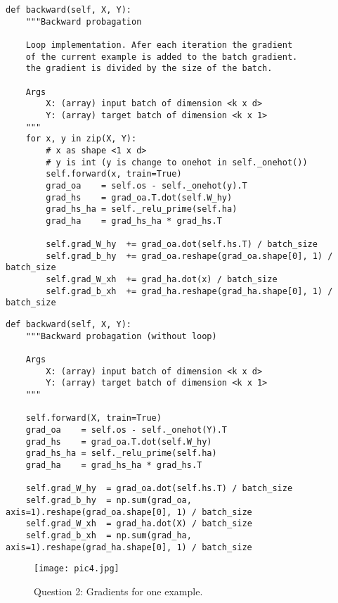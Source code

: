 \documentclass[11pt,english]{article}
\begin{document}
\begin{verbatim}
def backward(self, X, Y):
    """Backward probagation
    
    Loop implementation. Afer each iteration the gradient 
    of the current example is added to the batch gradient.
    the gradient is divided by the size of the batch.
    
    Args
        X: (array) input batch of dimension <k x d>
        Y: (array) target batch of dimension <k x 1>
    """
    for x, y in zip(X, Y):
        # x as shape <1 x d>
        # y is int (y is change to onehot in self._onehot())
        self.forward(x, train=True)
        grad_oa    = self.os - self._onehot(y).T
        grad_hs    = grad_oa.T.dot(self.W_hy)
        grad_hs_ha = self._relu_prime(self.ha)       
        grad_ha    = grad_hs_ha * grad_hs.T          

        self.grad_W_hy  += grad_oa.dot(self.hs.T) / batch_size
        self.grad_b_hy  += grad_oa.reshape(grad_oa.shape[0], 1) / batch_size 
        self.grad_W_xh  += grad_ha.dot(x) / batch_size                
        self.grad_b_xh  += grad_ha.reshape(grad_ha.shape[0], 1) / batch_size
\end{verbatim}

\begin{verbatim}
def backward(self, X, Y):
    """Backward probagation (without loop)

    Args
        X: (array) input batch of dimension <k x d>
        Y: (array) target batch of dimension <k x 1>
    """

    self.forward(X, train=True)
    grad_oa    = self.os - self._onehot(Y).T
    grad_hs    = grad_oa.T.dot(self.W_hy)
    grad_hs_ha = self._relu_prime(self.ha)       
    grad_ha    = grad_hs_ha * grad_hs.T          
    
    self.grad_W_hy  = grad_oa.dot(self.hs.T) / batch_size      
    self.grad_b_hy  = np.sum(grad_oa, axis=1).reshape(grad_oa.shape[0], 1) / batch_size
    self.grad_W_xh  = grad_ha.dot(X) / batch_size               
    self.grad_b_xh  = np.sum(grad_ha, axis=1).reshape(grad_ha.shape[0], 1) / batch_size
\end{verbatim}

\begin{figure}
	\texttt{[image: pic4.jpg]}
	\caption{Question 2: Gradients for one example.}
	\label{fig:boat1}
\end{figure}
\end{document}

